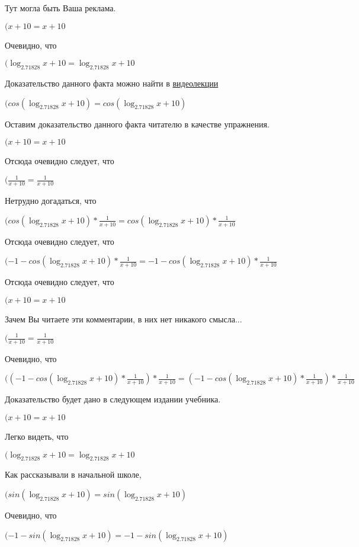 \documentclass[12pt,a4paper,fleqn]{article}
\theoremstyle{definition}
\begin{document}
Тут могла быть Ваша реклама.

$( x  +  10  =  x  +  10 $

Очевидно, что

$(\log_{ 2.71828 }{ x  +  10 } = \log_{ 2.71828 }{ x  +  10 }$

Доказательство данного факта можно найти в \href{https://www.youtube.com/watch?v=dQw4w9WgXcQ}{видеолекции}

$(cos(\log_{ 2.71828 }{ x  +  10 }) = cos(\log_{ 2.71828 }{ x  +  10 })$

Оставим доказательство данного факта читателю в качестве упражнения.

$( x  +  10  =  x  +  10 $

Отсюда очевидно следует, что

$(\frac{ 1 }{ x  +  10 }
 = \frac{ 1 }{ x  +  10 }
$

Нетрудно догадаться, что

$(cos(\log_{ 2.71828 }{ x  +  10 }) * \frac{ 1 }{ x  +  10 }
 = cos(\log_{ 2.71828 }{ x  +  10 }) * \frac{ 1 }{ x  +  10 }
$

Отсюда очевидно следует, что

$( -1  - cos(\log_{ 2.71828 }{ x  +  10 }) * \frac{ 1 }{ x  +  10 }
 =  -1  - cos(\log_{ 2.71828 }{ x  +  10 }) * \frac{ 1 }{ x  +  10 }
$

Отсюда очевидно следует, что

$( x  +  10  =  x  +  10 $

Зачем Вы читаете эти комментарии, в них нет никакого смысла...

$(\frac{ 1 }{ x  +  10 }
 = \frac{ 1 }{ x  +  10 }
$

Очевидно, что

$(( -1  - cos(\log_{ 2.71828 }{ x  +  10 }) * \frac{ 1 }{ x  +  10 }
) * \frac{ 1 }{ x  +  10 }
 = ( -1  - cos(\log_{ 2.71828 }{ x  +  10 }) * \frac{ 1 }{ x  +  10 }
) * \frac{ 1 }{ x  +  10 }
$

Доказательство будет дано в следующем издании учебника.

$( x  +  10  =  x  +  10 $

Легко видеть, что

$(\log_{ 2.71828 }{ x  +  10 } = \log_{ 2.71828 }{ x  +  10 }$

Как рассказывали в начальной школе,

$(sin(\log_{ 2.71828 }{ x  +  10 }) = sin(\log_{ 2.71828 }{ x  +  10 })$

Очевидно, что

$( -1  - sin(\log_{ 2.71828 }{ x  +  10 }) =  -1  - sin(\log_{ 2.71828 }{ x  +  10 })$
\end{document}
